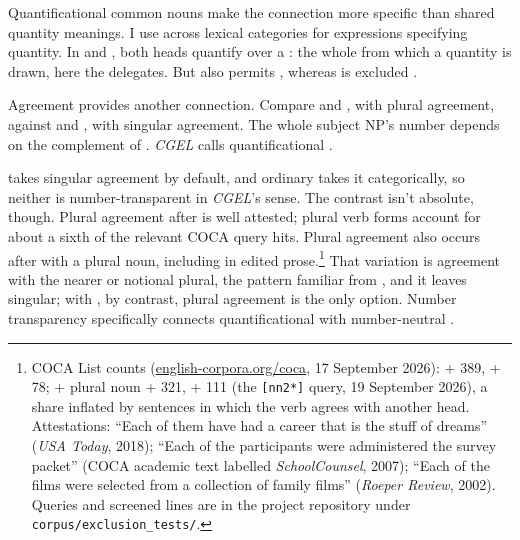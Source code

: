 \documentclass[12pt]{article}
\begin{document}
Quantificational common nouns make the connection more specific than shared quantity meanings. I use  across lexical categories for expressions specifying quantity. In  and , both heads quantify over a : the whole from which a quantity is drawn, here the delegates. But  also permits , whereas  is excluded \citep[349]{huddleston2002}.

Agreement provides another connection. Compare  and , with plural agreement, against  and , with singular agreement. The whole subject NP's number depends on the complement of . \textit{CGEL} calls quantificational   \citep[349--350, 501--503]{huddleston2002}.

 takes singular agreement by default, and ordinary  takes it categorically, so neither is number-transparent in \textit{CGEL}'s sense. The contrast isn't absolute, though. Plural agreement after  is well attested; plural verb forms account for about a sixth of the relevant COCA query hits. Plural agreement also occurs after  with a plural noun, including in edited prose.\footnote{COCA List counts (\href{https://www.english-corpora.org/coca/}{english-corpora.org/coca}, 17 September 2026):  +  389, +  78;  + plural noun +  321, +  111 (the \texttt{[nn2*]} query, 19 September 2026), a share inflated by sentences in which the verb agrees with another head. Attestations: \enquote{Each of them have had a career that is the stuff of dreams} (\textit{USA Today}, 2018); \enquote{Each of the participants were administered the survey packet} (COCA academic text labelled \textit{SchoolCounsel}, 2007); \enquote{Each of the films were selected from a collection of family films} (\textit{Roeper Review}, 2002). Queries and screened lines are in the project repository under \texttt{corpus/exclusion\_tests/}.} That variation is agreement with the nearer or notional plural, the pattern familiar from , and it leaves  singular; with , by contrast, plural agreement is the only option. Number transparency specifically connects quantificational  with number-neutral .
\end{document}
